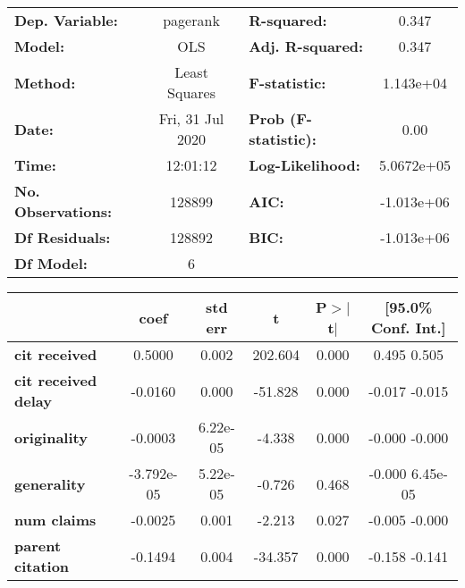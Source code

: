 \begin{center}
\begin{tabular}{lclc}
\toprule
\textbf{Dep. Variable:}     &     pagerank     & \textbf{  R-squared:         } &        0.347      \\
\textbf{Model:}             &       OLS        & \textbf{  Adj. R-squared:    } &        0.347      \\
\textbf{Method:}            &  Least Squares   & \textbf{  F-statistic:       } &    1.143e+04      \\
\textbf{Date:}              & Fri, 31 Jul 2020 & \textbf{  Prob (F-statistic):} &        0.00       \\
\textbf{Time:}              &     12:01:12     & \textbf{  Log-Likelihood:    } &    5.0672e+05     \\
\textbf{No. Observations:}  &      128899      & \textbf{  AIC:               } &    -1.013e+06     \\
\textbf{Df Residuals:}      &      128892      & \textbf{  BIC:               } &    -1.013e+06     \\
\textbf{Df Model:}          &           6      & \textbf{                     } &                   \\
\bottomrule
\end{tabular}
\begin{tabular}{lccccc}
                            & \textbf{coef} & \textbf{std err} & \textbf{t} & \textbf{P$>$$|$t$|$} & \textbf{[95.0\% Conf. Int.]}  \\
\midrule
\textbf{cit received}       &       0.5000  &        0.002     &   202.604  &         0.000        &         0.495     0.505       \\
\textbf{cit received delay} &      -0.0160  &        0.000     &   -51.828  &         0.000        &        -0.017    -0.015       \\
\textbf{originality}        &      -0.0003  &     6.22e-05     &    -4.338  &         0.000        &        -0.000    -0.000       \\
\textbf{generality}         &   -3.792e-05  &     5.22e-05     &    -0.726  &         0.468        &        -0.000  6.45e-05       \\
\textbf{num claims}         &      -0.0025  &        0.001     &    -2.213  &         0.027        &        -0.005    -0.000       \\
\textbf{parent citation}    &      -0.1494  &        0.004     &   -34.357  &         0.000        &        -0.158    -0.141       \\

\end{tabular}
\end{center}
